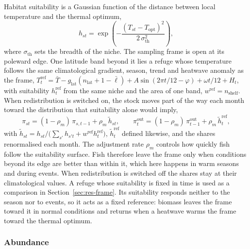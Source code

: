 \documentclass[11pt,a4paper]{article}
\newcommand{\vt}[1]{\text{#1}}
\begin{document}
Habitat suitability is a Gaussian function of the distance between local temperature and the thermal optimum,
\begin{equation}
h_{st} = \exp\!\left(-\frac{(T_{st}-T_{\vt{opt}})^2}{2\,\sigma_{\vt{th}}^2}\right),
\label{eq:suit}
\end{equation}
where $\sigma_{\vt{th}}$ sets the breadth of the niche. The sampling frame is open at its poleward edge. One latitude band beyond it lies a refuge whose temperature follows the same climatological gradient, season, trend and heatwave anomaly as the frame, $T^{\vt{ref}}_t = \bar T - g_{\vt{lat}}(n_{\vt{lat}}+1-\bar\ell) + A\sin(2\pi t/12-\varphi) + \omega t/12 + H_t$, with suitability $h^{\vt{ref}}_t$ from the same niche and the area of one band, $w^{\vt{ref}} = n_{\vt{shelf}}$. When redistribution is switched on, the stock moves part of the way each month toward the distribution that suitability alone would imply,
\begin{equation}
\pi_{st} = (1-\rho_m)\,\pi_{s,t-1} + \rho_m\,\tilde h_{st}, \qquad \pi^{\vt{out}}_t = (1-\rho_m)\,\pi^{\vt{out}}_{t-1} + \rho_m\,\tilde h^{\vt{ref}}_t,
\label{eq:move}
\end{equation}
with $\tilde h_{st} = h_{st}\big/\big(\sum_{s'}h_{s't} + w^{\vt{ref}}h^{\vt{ref}}_t\big)$, $\tilde h^{\vt{ref}}_t$ defined likewise, and the shares renormalised each month. The adjustment rate $\rho_m$ controls how quickly fish follow the suitability surface. Fish therefore leave the frame only when conditions beyond its edge are better than within it, which here happens in warm seasons and during events. When redistribution is switched off the shares stay at their climatological values. A refuge whose suitability is fixed in time is used as a comparison in Section~\ref{sec:res-frame}. Its suitability responds neither to the season nor to events, so it acts as a fixed reference: biomass leaves the frame toward it in normal conditions and returns when a heatwave warms the frame toward the thermal optimum.

\subsubsection{Abundance}
\end{document}
